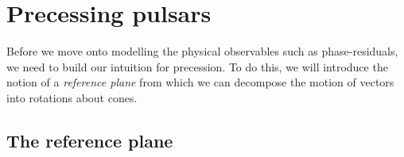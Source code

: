 \documentclass[../full_thesis/full_thesis.tex]{subfiles}
\begin{document}
%




\section{Precessing pulsars}
Before we move onto modelling the physical observables such as phase-residuals,
we need to build our intuition for precession. To do this, we will introduce
the notion of a \emph{reference plane} from which we can decompose the motion of
vectors into rotations about cones.

\subsection{The reference plane}
\label{sec: reference plane}
\end{document}

